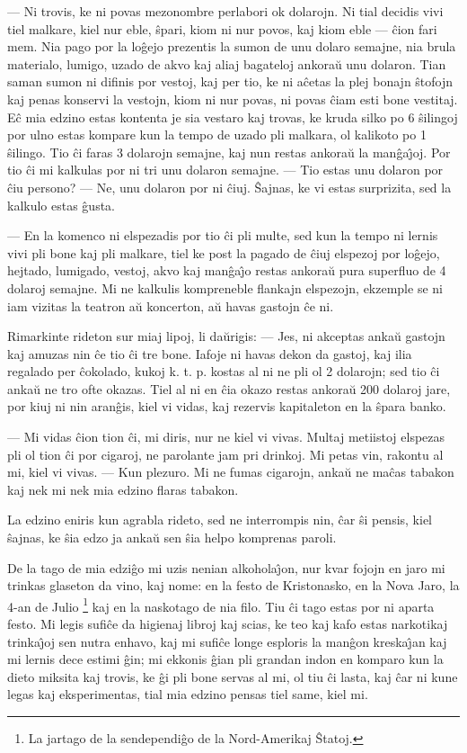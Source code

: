  --- Ni trovis, ke ni povas mezonombre perlabori ok dolarojn. Ni tial
decidis vivi tiel malkare, kiel nur eble, \^spari, kiom ni nur
povos, kaj kiom eble --- \^cion fari mem. Nia pago por la lo\^gejo
prezentis la sumon de unu dolaro semajne, nia brula materialo,
lumigo, uzado de akvo kaj aliaj bagateloj ankora\u u unu dolaron.
Tian saman sumon ni difinis por vestoj, kaj per tio, ke ni a\^cetas
la plej bonajn \^stofojn kaj penas konservi la vestojn, kiom ni nur
povas, ni povas \^ciam esti bone vestitaj. E\^c mia edzino estas
kontenta je sia vestaro kaj trovas, ke kruda silko po 6 \^silingoj
por ulno estas kompare kun la tempo de uzado pli malkara, ol
kalikoto po 1 \^silingo. Tio \^ci faras 3 dolarojn semajne, kaj nun
restas ankora\u u la man\^ga\^{\j}oj. Por tio \^ci mi kalkulas por
ni tri unu dolaron semajne. --- Tio estas unu dolaron por \^ciu
persono? --- Ne, unu dolaron por ni \^ciuj. \^Sajnas, ke vi estas
surprizita, sed la kalkulo estas \^gusta.

 --- En la komenco ni elspezadis por tio \^ci pli multe, sed kun la
tempo ni lernis vivi pli bone kaj pli malkare, tiel ke post la
pagado de \^ciuj elspezoj por lo\^gejo, hejtado, lumigado, vestoj,
akvo kaj man\^ga\^{\j}o restas ankora\u u pura superfluo de 4
dolaroj semajne. Mi ne kalkulis kompreneble flankajn elspezojn,
ekzemple se ni iam vizitas la teatron a\u u koncerton, a\u u havas
gastojn \^ce ni.

   Rimarkinte rideton sur miaj lipoj, li da\u urigis: --- Jes, ni akceptas
anka\u u gastojn kaj amuzas nin \^ce tio \^ci tre bone. Iafoje ni
havas dekon da gastoj, kaj ilia regalado per \^cokolado, kukoj k. t.
p. kostas al ni ne pli ol 2 dolarojn; sed tio \^ci anka\u u ne tro
ofte okazas. Tiel al ni en \^cia okazo restas ankora\u u 200 dolaroj
jare, por kiuj ni nin aran\^gis, kiel vi vidas, kaj rezervis
kapitaleton en la \^spara banko.

 --- Mi vidas \^cion tion \^ci, mi diris, nur ne kiel vi vivas. Multaj
metiistoj elspezas pli ol tion \^ci por cigaroj, ne parolante jam
pri drinkoj. Mi petas vin, rakontu al mi, kiel vi vivas. --- Kun
plezuro. Mi ne fumas cigarojn, anka\u u ne ma\^cas tabakon kaj nek
mi nek mia edzino flaras tabakon.

   La edzino eniris kun agrabla rideto, sed ne interrompis nin, \^car \^si
pensis, kiel \^sajnas, ke \^sia edzo ja anka\u u sen \^sia helpo
komprenas paroli.

   De la tago de mia edzi\^go mi uzis nenian alkohola\^{\j}on, nur kvar
fojojn en jaro mi trinkas glaseton da vino, kaj nome: en la festo de
Kristonasko, en la Nova Jaro, la 4-an de Julio \footnote{La jartago
de la sendependi\^go de la Nord-Amerikaj \^Statoj.} kaj en la
naskotago de nia filo. Tiu \^ci tago estas por ni aparta festo. Mi
legis sufi\^ce da higienaj libroj kaj scias, ke teo kaj kafo estas
narkotikaj trinka\^{\j}oj sen nutra enhavo, kaj mi sufi\^ce longe
esploris la man\^gon kreska\^{\j}an kaj mi lernis dece estimi \^gin;
mi ekkonis \^gian pli grandan indon en komparo kun la dieto miksita
kaj trovis, ke \^gi pli bone servas al mi, ol tiu \^ci lasta, kaj
\^car ni kune legas kaj eksperimentas, tial mia edzino pensas tiel
same, kiel mi.

